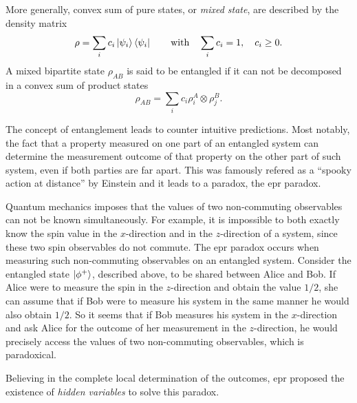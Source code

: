 More generally, convex sum of pure states, or \textit{mixed state}, are described by the density matrix
\begin{equation}
	\rho = \sum_i c_i \ket{\psi_i} \bra{\psi_i} \qquad \text{with} \quad \sum_i c_i = 1,\quad c_i\geq 0.
	\label{eq:mixed_state}
\end{equation}
A mixed bipartite state $\rho_{AB}$ is said to be entangled if it can not be decomposed in a convex sum of product states
\begin{equation}
	\rho_{AB} = \sum_i c_i \rho^A_i \otimes \rho^B_j.
	\label{eq:product_state}
\end{equation}

\medbreak

The concept of entanglement leads to counter intuitive predictions. 
Most notably, the fact that a property measured on one part of an entangled system can determine the measurement outcome of that property on the other part of such system, even if both parties are far apart. 
This was famously refered as a \enquote{spooky action at distance} by Einstein and it leads to a paradox, the \acrshort{epr} paradox.

Quantum mechanics imposes that the values of two non-commuting observables can not be known simultaneously. 
For example, it is impossible to both exactly know the spin value in the $x$-direction and in the $z$-direction of a system, since these two spin observables do not commute.
The \acrshort{epr} paradox occurs when measuring such non-commuting observables on an entangled system.
Consider the entangled state $\ket{\phi^+}$, described above, to be shared between Alice and Bob.
If Alice were to measure the spin in the $z$-direction and obtain the value $1/2$, she can assume that if Bob were to measure his system in the same manner he would also obtain $1/2$. 
So it seems that if Bob measures his system in the $x$-direction and ask Alice for the outcome of her measurement in the $z$-direction, he would precisely access the values of two non-commuting observables, which is paradoxical.

Believing in the complete local determination of the outcomes, \acrlong{epr} proposed the existence of \textit{hidden variables} to solve this paradox. 

